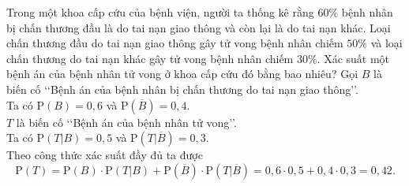 \begin{bt}%
	Trong một khoa cấp cứu của bệnh viện, người ta thống kê rằng $60\%$ bệnh nhân bị chấn thương đầu là do tai nạn giao thông và còn lại là do tai nạn khác. Loại chấn thương đầu do tai nạn giao thông gây tử vong bệnh nhân chiếm $50\%$ và loại chấn thương do tai nạn khác gây tử vong bệnh nhân chiếm $30\%$. Xác suất một bệnh án của bệnh nhân tử vong ở khoa cấp cứu đó bằng bao nhiêu? 
	\loigiai
	{
		Gọi $B$ là biến cố \lq\lq Bệnh án của bệnh nhân bị chấn thương do tai nạn giao thông\rq\rq.\\ Ta có $\mathrm{P}(B)=0{,}6$ và $\mathrm{P}\left(\overline{B}\right)= 0{,}4$.\\
		$T$ là biến cố \lq\lq Bệnh án của bệnh nhân tử vong\rq\rq.\\ Ta có $\mathrm{P}(T|B)= 0{,}5$ và $\mathrm{P}\left(T|\overline{B}\right)= 0{,}3$.\\
		Theo công thức xác suất đầy đủ ta được
		\[
		\mathrm{P}(T)= \mathrm{P}(B) \cdot \mathrm{P}(T|B) + \mathrm{P}\left(\overline{B}\right) \cdot \mathrm{P}\left(T|\overline{B}\right)= 0{,}6 \cdot 0{,}5 + 0{,}4 \cdot 0{,}3= 0{,}42.
		\]
	}
\end{bt}

